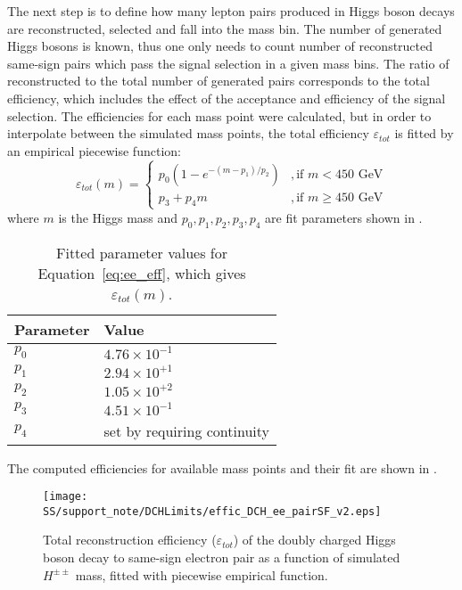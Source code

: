The next step is to define how many lepton pairs produced in Higgs boson decays are reconstructed, selected and fall into the mass bin.
The number of generated Higgs bosons is known, 
thus one only needs to count number of reconstructed same-sign pairs which pass the signal selection in a given mass bins.
The ratio of reconstructed to the total number of generated pairs corresponds to the total efficiency, which includes the effect of the acceptance and efficiency of the signal selection.
The efficiencies for each mass point were calculated, but in order to interpolate between the simulated mass points, the total efficiency $\varepsilon_{tot}$ is fitted by
an empirical piecewise function:
\begin{equation}
\varepsilon_{tot}(m) = \begin{cases} p_{0} (1-e^{-(m-p_{1})/p_{2}}) & ,\mbox{if } m < 450\mbox{ GeV} \\ 
p_{3} + p_{4} m & ,\mbox{if } m \geq 450\mbox{ GeV} \end{cases}
\label{eq:ee_eff}
\end{equation}
where $m$ is the Higgs mass and $p_{0}, p_{1}, p_{2}, p_{3}, p_{4}$ are fit parameters shown in .
\begin{table}[htbp]
    \begin{center}
    \begin{tabular}{ l | l }
        \hline
        Parameter & Value \\
        \hline
        $p_{0}$    & $4.76 \times 10^{-1}$ \\[+0.05in]
        $p_{1}$    & $2.94 \times 10^{+1}$ \\[+0.05in]
        $p_{2}$    & $1.05 \times 10^{+2}$ \\[+0.05in]
        $p_{3}$    & $4.51 \times 10^{-1}$ \\[+0.05in]
        $p_{4}$    & set by requiring continuity \\[+0.05in]
        \hline
    \end{tabular}
    \end{center}
    \caption{Fitted parameter values for Equation~\ref{eq:ee_eff}, which gives $\varepsilon_{tot}(m)$.}
    \label{tab:ee_eff_params}
\end{table}

The computed efficiencies for available mass points and their fit are shown in .

\begin{figure}[h]
\begin{center}
\texttt{[image: SS/support\_note/DCHLimits/effic\_DCH\_ee\_pairSF\_v2.eps]}
\caption{Total reconstruction efficiency ($\varepsilon_{tot}$) of the doubly charged Higgs boson decay to same-sign electron pair as a function of simulated $H^{\pm\pm}$ mass, fitted with piecewise empirical function.}
\label{fig:signal_efficiency}
\end{center}
\end{figure}


